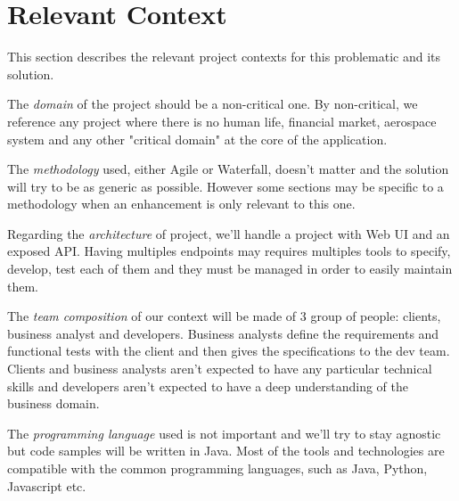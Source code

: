 \section{Relevant Context}\label{sec:relevant-context}
This section describes the relevant project contexts for this problematic
and its solution.

The \textit{domain} of the project should be a non-critical one.
By non-critical, we reference any project where there is no human life,
financial market, aerospace system and any other "critical domain" at
the core of the application.

The \textit{methodology} used, either Agile or Waterfall, doesn't
matter and the solution will try to be as generic as possible.
However some sections may be specific to a methodology when an enhancement is
only relevant to this one.

Regarding the \textit{architecture} of project, we'll handle a project with
Web UI and an exposed API\@.
Having multiples endpoints may requires multiples tools to specify, develop,
test each of them and they must be managed in order to easily maintain them.

The \textit{team composition} of our context will be made of 3 group of people:
clients, business analyst and developers.
Business analysts define the requirements and functional tests with the client
and then gives the specifications to the dev team.
Clients and business analysts aren't expected to have any particular technical
skills and developers aren't expected to have a deep understanding of the
business domain.

The \textit{programming language} used is not important and we'll try to stay
agnostic but code samples will be written in Java.
Most of the tools and technologies are compatible with the common programming
languages, such as Java, Python, Javascript etc.
